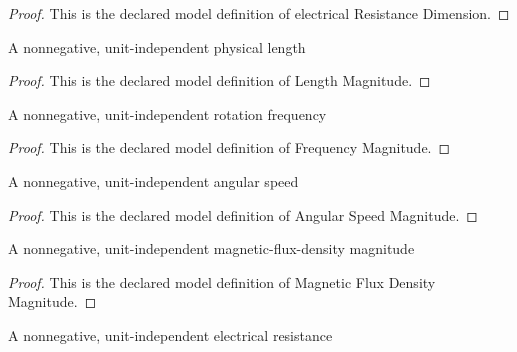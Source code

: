 \begin{proof}
  This is the declared model definition of electrical Resistance Dimension.
\end{proof}
\begin{definition}
  \label{def:physics:phyx-mini-0982:phyxminiproblems-problemphyxmini0982-lengthmagnitude}
  A nonnegative, unit-independent physical length
\end{definition}
\begin{proof}
  This is the declared model definition of Length Magnitude.
\end{proof}
\begin{definition}
  \label{def:physics:phyx-mini-0982:phyxminiproblems-problemphyxmini0982-frequencymagnitude}
  A nonnegative, unit-independent rotation frequency
\end{definition}
\begin{proof}
  This is the declared model definition of Frequency Magnitude.
\end{proof}
\begin{definition}
  \label{def:physics:phyx-mini-0982:phyxminiproblems-problemphyxmini0982-angularspeedmagnitude}
  A nonnegative, unit-independent angular speed
\end{definition}
\begin{proof}
  This is the declared model definition of Angular Speed Magnitude.
\end{proof}
\begin{definition}
  \label{def:physics:phyx-mini-0982:phyxminiproblems-problemphyxmini0982-magneticfluxdensitymagnitude}
  A nonnegative, unit-independent magnetic-flux-density magnitude
\end{definition}
\begin{proof}
  This is the declared model definition of Magnetic Flux Density Magnitude.
\end{proof}
\begin{definition}
  \label{def:physics:phyx-mini-0982:phyxminiproblems-problemphyxmini0982-resistancemagnitude}
  A nonnegative, unit-independent electrical resistance
\end{definition}
